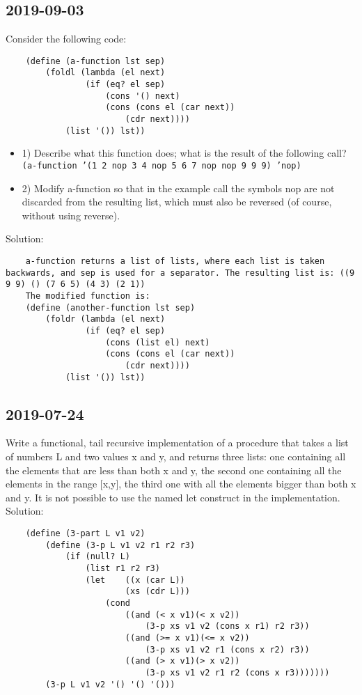 \subsection{2019-09-03}
Consider the following code:
\begin{lstlisting}
    (define (a-function lst sep)
        (foldl (lambda (el next)
                (if (eq? el sep)
                    (cons '() next)
                    (cons (cons el (car next))
                        (cdr next))))
            (list '()) lst))
\end{lstlisting}
\begin{itemize}
    \item 1) Describe what this function does; what is the result of the following call? \\
            \texttt{(a-function '(1 2 nop 3 4 nop 5 6 7 nop nop 9 9 9) 'nop)}
    \item 2) Modify a-function so that in the example call the symbols nop are not discarded from the resulting list,
    which must also be reversed (of course, without using reverse).
\end{itemize}
Solution:
\begin{lstlisting}
    a-function returns a list of lists, where each list is taken backwards, and sep is used for a separator. The resulting list is: ((9 9 9) () (7 6 5) (4 3) (2 1))
    The modified function is:
    (define (another-function lst sep)
        (foldr (lambda (el next)
                (if (eq? el sep)
                    (cons (list el) next)
                    (cons (cons el (car next))
                        (cdr next))))
            (list '()) lst))
\end{lstlisting}




\subsection{2019-07-24}
Write a functional, tail recursive implementation of a procedure that takes a list of numbers L and two values
x and y, and returns three lists: one containing all the elements that are less than both x and y, the second one
containing all the elements in the range [x,y], the third one with all the elements bigger than both x and y. It
is not possible to use the named let construct in the implementation. \\
Solution:
\begin{lstlisting}
    (define (3-part L v1 v2)
        (define (3-p L v1 v2 r1 r2 r3)
            (if (null? L)
                (list r1 r2 r3)
                (let    ((x (car L))
                        (xs (cdr L)))
                    (cond
                        ((and (< x v1)(< x v2))
                            (3-p xs v1 v2 (cons x r1) r2 r3))
                        ((and (>= x v1)(<= x v2))
                            (3-p xs v1 v2 r1 (cons x r2) r3))
                        ((and (> x v1)(> x v2))
                            (3-p xs v1 v2 r1 r2 (cons x r3)))))))
        (3-p L v1 v2 '() '() '()))
\end{lstlisting}





